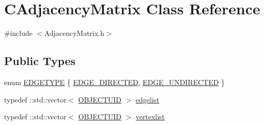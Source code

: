 \hypertarget{class_c_adjacency_matrix}{}\section{C\+Adjacency\+Matrix Class Reference}
\label{class_c_adjacency_matrix}


{\ttfamily \#include $<$Adjacency\+Matrix.\+h$>$}

\subsection*{Public Types}
\begin{DoxyCompactItemize}
\item 
enum \hyperlink{class_c_adjacency_matrix_a0a423c30d8ec51bbdb1dbc7c192372e5}{E\+D\+G\+E\+T\+Y\+P\+E} \{ \hyperlink{class_c_adjacency_matrix_a0a423c30d8ec51bbdb1dbc7c192372e5ac4c25b16a7e4f8539d7e9ed057c45fa8}{E\+D\+G\+E\+\_\+\+D\+I\+R\+E\+C\+T\+E\+D}, 
\hyperlink{class_c_adjacency_matrix_a0a423c30d8ec51bbdb1dbc7c192372e5a5e6346c6b06c9404fa2b5d73c852b6c6}{E\+D\+G\+E\+\_\+\+U\+N\+D\+I\+R\+E\+C\+T\+E\+D}
 \}
\item 
typedef \+::std\+::vector$<$ \hyperlink{_object_database_defines_8h_a164ec120b01429b93c9cd0bef2a67e64}{O\+B\+J\+E\+C\+T\+U\+I\+D} $>$ \hyperlink{class_c_adjacency_matrix_a22be75654b2f4c6c0e36471c5d6521fd}{edgelist}
\item 
typedef \+::std\+::vector$<$ \hyperlink{_object_database_defines_8h_a164ec120b01429b93c9cd0bef2a67e64}{O\+B\+J\+E\+C\+T\+U\+I\+D} $>$ \hyperlink{class_c_adjacency_matrix_a8693a9f946f9f2142a9a7cb2b84f4b4c}{vertexlist}
\end{DoxyCompactItemize}
